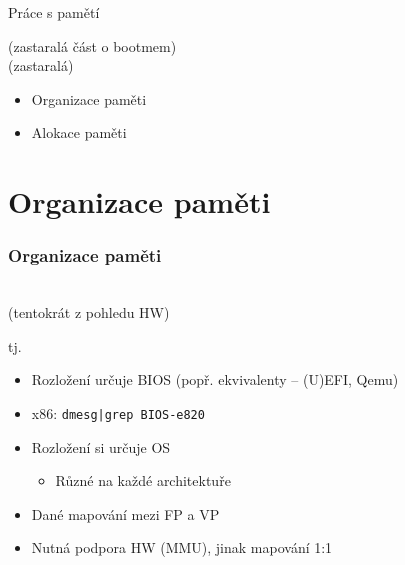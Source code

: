 
\iffimuni\else

\begin{frame}{Práce s pamětí}

   (zastaralá část o bootmem)\\
   (zastaralá)

  \bigskip

  \begin{itemize}
  \item Organizace paměti
  \item Alokace paměti
  \end{itemize}

\end{frame}

\fi

\iffimuni
\section{Organizace paměti}
\frame{\sectionpage}
\fi

\begin{frame}
  \frametitle{Organizace paměti}

  \begin{center}
   \\
  (tentokrát z pohledu HW)

  \pause
  \bigskip

  tj.\\
  \end{center}

  \pause
  \medskip

  \begin{itemize}
  \item Rozložení určuje BIOS (popř. ekvivalenty -- (U)EFI, Qemu)
  \item x86: \texttt{dmesg|grep BIOS-e820}
  \end{itemize}

  \pause

  \begin{itemize}
  \item Rozložení si určuje OS
  \begin{itemize}
  \item Různé na každé architektuře
  \end{itemize}
  \item Dané mapování mezi FP a VP
  \item Nutná podpora HW (MMU), jinak mapování 1:1
  \end{itemize}

\end{frame}


